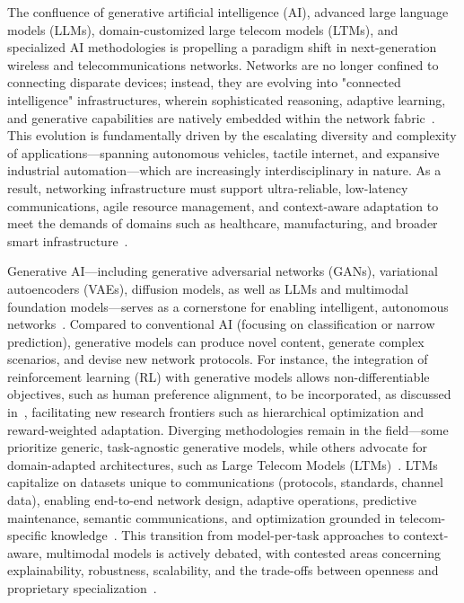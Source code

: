 \documentclass[sigconf]{acmart}
\begin{document}
The confluence of generative artificial intelligence (AI), advanced large language models (LLMs), domain-customized large telecom models (LTMs), and specialized AI methodologies is propelling a paradigm shift in next-generation wireless and telecommunications networks. Networks are no longer confined to connecting disparate devices; instead, they are evolving into "connected intelligence" infrastructures, wherein sophisticated reasoning, adaptive learning, and generative capabilities are natively embedded within the network fabric~\cite{ref46,ref49}. This evolution is fundamentally driven by the escalating diversity and complexity of applications---spanning autonomous vehicles, tactile internet, and expansive industrial automation---which are increasingly interdisciplinary in nature. As a result, networking infrastructure must support ultra-reliable, low-latency communications, agile resource management, and context-aware adaptation to meet the demands of domains such as healthcare, manufacturing, and broader smart infrastructure~\cite{ref46,ref49,ref45}.

Generative AI—including generative adversarial networks (GANs), variational autoencoders (VAEs), diffusion models, as well as LLMs and multimodal foundation models—serves as a cornerstone for enabling intelligent, autonomous networks~\cite{ref7}. Compared to conventional AI (focusing on classification or narrow prediction), generative models can produce novel content, generate complex scenarios, and devise new network protocols. For instance, the integration of reinforcement learning (RL) with generative models allows non-differentiable objectives, such as human preference alignment, to be incorporated, as discussed in~\cite{ref1}, facilitating new research frontiers such as hierarchical optimization and reward-weighted adaptation. Diverging methodologies remain in the field---some prioritize generic, task-agnostic generative models, while others advocate for domain-adapted architectures, such as Large Telecom Models (LTMs)~\cite{ref26,ref33,ref21}. LTMs capitalize on datasets unique to communications (protocols, standards, channel data), enabling end-to-end network design, adaptive operations, predictive maintenance, semantic communications, and optimization grounded in telecom-specific knowledge~\cite{ref26,ref33,ref21}. This transition from model-per-task approaches to context-aware, multimodal models is actively debated, with contested areas concerning explainability, robustness, scalability, and the trade-offs between openness and proprietary specialization~\cite{ref21,ref26,ref7}.
\end{document}
